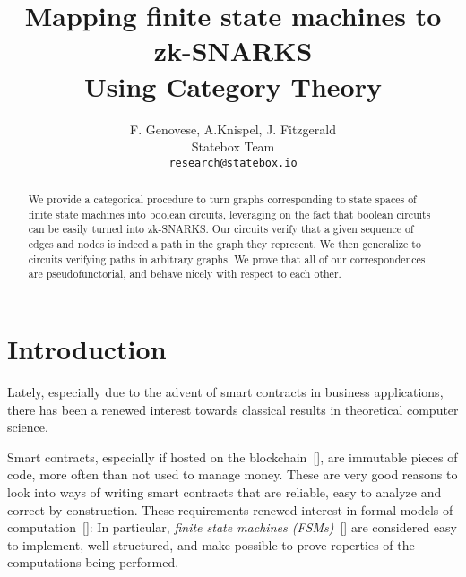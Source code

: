 \documentclass[submission,copyright,creativecommons,sharealike,noncommercial]{eptcs}
\title{Mapping finite state machines to zk-SNARKS \\ Using Category Theory}
\author{
	F. Genovese, A.Knispel, J. Fitzgerald \\
	Statebox Team\\
	\texttt{research@statebox.io}
}
\begin{document}
\maketitle
%
%
\begin{abstract}
  We provide a categorical procedure to turn graphs corresponding to 
  state spaces of finite state machines into boolean circuits, leveraging on the fact that 
  boolean circuits can be easily turned into zk-SNARKS. Our 
  circuits verify that a given sequence of edges and nodes is indeed a 
  path in the graph they represent. We then generalize to circuits verifying 
  paths in arbitrary graphs. We prove that all of our correspondences are 
  pseudofunctorial, and behave nicely with respect to each other.
\end{abstract}
%
%
%
\section{Introduction}\label{sec:introduction}
%
%
Lately, especially due to the advent of smart contracts 
in business applications, there has been a renewed interest towards 
classical results in theoretical computer science.

Smart contracts, especially if hosted on the blockchain~[], are immutable
pieces of code, more often than not used to manage money. These are 
very good reasons to look into ways of writing smart contracts  
that are reliable, easy to analyze and correct-by-construction. These requirements
 renewed interest in formal models of computation~[]: In particular, 
 \emph{finite state machines (FSMs)}~[] are considered easy 
 to implement, well structured, and make possible to prove 
 roperties of the computations being performed. 
\end{document}
